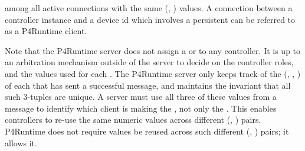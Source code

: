 \documentclass[11pt]{article}
\begin{document}
{\begin{itemize}
among all active  connections with the same (,
) values.  A connection between a controller instance and a device id
\textemdash{} which involves a persistent  \textemdash{} can be referred to as a
P4Runtime client.%

Note that the P4Runtime server does not assign a  or  to
any controller. It is up to an arbitration mechanism outside of the server to
decide on the controller roles, and the  values used for each
. The P4Runtime server only keeps track of the (,
, ) of each  that has sent a successful
 message, and maintains the invariant that all such
3-tuples are unique. A server must use all three of these values from a
 message to identify which client is making the ,
not only the . This enables controllers to re-use the same
numeric  values across different (, )
pairs. P4Runtime does not require  values be reused across such
different (, ) pairs; it allows it.%


\end{itemize}}
\end{document}
